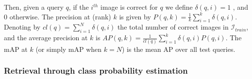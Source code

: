 \documentclass{article}
\begin{document}
Then, given a query $q$, if the $i^{th}$ image is correct for $q$ we define $\delta (q, i)=1$ , and $0$ otherwise. The precision at (rank) $k$ is given by $P(q,k) = \tfrac{1}{k} {\sum}_{i=1}^{k} \delta (q, i)$. Denoting by $cl(q) = {\sum}_{i=1}^{N} \delta (q, i)$ the total number of correct images in $\mathcal{I}_{train}$, and the average precision at $k$ is $AP(q, k) = \tfrac{1}{cl(q)}{\sum}_{i=1}^{k}\delta (q, i) P(q,i)$. The mAP at $k$ (or simply mAP when $k = N$) is the mean AP over all test queries.

\subsubsection*{Retrieval through class probability estimation}

\end{document}
